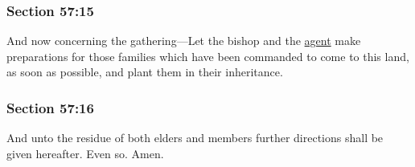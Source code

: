 	\subsubsection{Section 57:15} %
		\label{DC57-15}

		And now concerning the gathering---Let the bishop and the \hyperref[AGENCY]{agent} make preparations for those families which have been commanded to come to this land, as soon as possible, and plant them in their inheritance.


	\subsubsection{Section 57:16} %
		\label{DC57-16}

		And unto the residue of both elders and members further directions shall be given hereafter.  Even so.  Amen.

